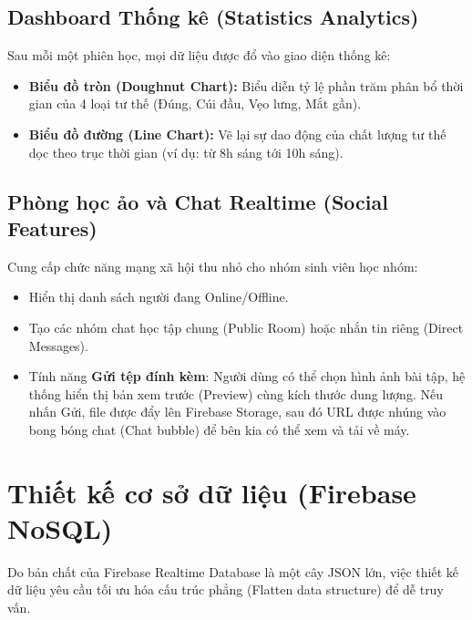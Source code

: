 \documentclass[12pt,a4paper]{report}
\begin{document}
\subsection{Dashboard Thống kê (Statistics Analytics)}
Sau mỗi một phiên học, mọi dữ liệu được đổ vào giao diện thống kê:
\begin{itemize}
    \item \textbf{Biểu đồ tròn (Doughnut Chart):} Biểu diễn tỷ lệ phần trăm phân bổ thời gian của 4 loại tư thế (Đúng, Cúi đầu, Vẹo lưng, Mắt gần).
    \item \textbf{Biểu đồ đường (Line Chart):} Vẽ lại sự dao động của chất lượng tư thế dọc theo trục thời gian (ví dụ: từ 8h sáng tới 10h sáng).
\end{itemize}

\subsection{Phòng học ảo và Chat Realtime (Social Features)}
Cung cấp chức năng mạng xã hội thu nhỏ cho nhóm sinh viên học nhóm:
\begin{itemize}
    \item Hiển thị danh sách người đang Online/Offline.
    \item Tạo các nhóm chat học tập chung (Public Room) hoặc nhắn tin riêng (Direct Messages).
    \item Tính năng \textbf{Gửi tệp đính kèm}: Người dùng có thể chọn hình ảnh bài tập, hệ thống hiển thị bản xem trước (Preview) cùng kích thước dung lượng. Nếu nhấn Gửi, file được đẩy lên Firebase Storage, sau đó URL được nhúng vào bong bóng chat (Chat bubble) để bên kia có thể xem và tải về máy.
\end{itemize}

\section{Thiết kế cơ sở dữ liệu (Firebase NoSQL)}
Do bản chất của Firebase Realtime Database là một cây JSON lớn, việc thiết kế dữ liệu yêu cầu tối ưu hóa cấu trúc phẳng (Flatten data structure) để dễ truy vấn.
\end{document}
